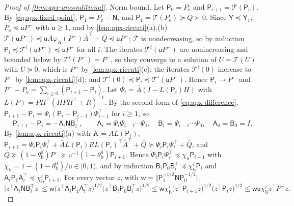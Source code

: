 \begin{proof}[Proof of \cref{thm:apx-unconditional}]
Norm bound. Let $\mathsf P_0=P_{\mathrm e}$ and $\mathsf P_{i+1}=\mathcal T(\mathsf P_i)$. By \cref{eq:apx-fixed-point}, $\mathsf P_1=P_{\mathrm e}-\mathsf N$, and $\mathsf P_1=\mathcal T(P_{\mathrm e})\succeq\bar Q\succ0$. Since $\mathsf Y\preceq\mathsf Y_1$, $P_{\mathrm e}\preceq\mathsf uP^-$ with $\mathsf u\ge1$, and by \cref{lem:apx-riccati}(a),(b) $\mathcal T(\mathsf uP^-)\preceq\mathsf u\bar A\varphi_R(P^-)\bar A^\top+\bar Q\preceq\mathsf uP^-$; $\mathcal T$ is nondecreasing, so by induction $\mathsf P_i\preceq\mathcal T^i(\mathsf uP^-)\preceq\mathsf uP^-$ for all $i$. The iterates $\mathcal T^i(\mathsf uP^-)$ are nonincreasing and bounded below by $\mathcal T^i(P^-)=P^-$, so they converge to a solution of $U=\mathcal T(U)$ with $U\succeq0$, which is $P^-$ by \cref{lem:apx-riccati}(c); the iterates $\mathcal T^i(0)$ increase to $P^-$ by \cref{lem:apx-riccati}(d); and $\mathcal T^i(0)\preceq\mathsf P_i\preceq\mathcal T^i(\mathsf uP^-)$. Hence $\mathsf P_i\to P^-$ and $P^--P_{\mathrm e}=\sum_{i\ge0}(\mathsf P_{i+1}-\mathsf P_i)$. Let $\Psi_i=\bar A(I-L(\mathsf P_i)H)$ with $L(P)=PH^\top(HPH^\top+R)^{-1}$. By the second form of \cref{eq:apx-difference}, $\mathsf P_{i+1}-\mathsf P_i=\Psi_i(\mathsf P_i-\mathsf P_{i-1})\Psi_{i-1}^\top$ for $i\ge1$, so
\begin{equation*}
\mathsf P_{i+1}-\mathsf P_i=-\mathsf A_i\mathsf N\mathsf B_i^\top,\qquad\mathsf A_i=\Psi_i\Psi_{i-1}\cdots\Psi_1,\quad\mathsf B_i=\Psi_{i-1}\cdots\Psi_0,\quad\mathsf A_0=\mathsf B_0=I .
\end{equation*}
By \cref{lem:apx-riccati}(a) with $K=\bar AL(\mathsf P_i)$, $\mathsf P_{i+1}=\Psi_i\mathsf P_i\Psi_i^\top+\bar AL(\mathsf P_i)RL(\mathsf P_i)^\top\bar A^\top+\bar Q\succeq\Psi_i\mathsf P_i\Psi_i^\top+\bar Q$, and $\bar Q\succeq(1-\theta^0_{\mathrm b})P^-\succeq\mathsf u^{-1}(1-\theta^0_{\mathrm b})\mathsf P_{i+1}$. Hence $\Psi_i\mathsf P_i\Psi_i^\top\preceq\chi_{\mathrm b}\mathsf P_{i+1}$ with $\chi_{\mathrm b}=1-(1-\theta^0_{\mathrm b})/\mathsf u\in[0,1)$, and by induction $\mathsf B_i\mathsf P_0\mathsf B_i^\top\preceq\chi_{\mathrm b}^i\mathsf P_i$ and $\mathsf A_i\mathsf P_1\mathsf A_i^\top\preceq\chi_{\mathrm b}^i\mathsf P_{i+1}$. For every vector $z$, with $\mathsf w=\Vert\mathsf P_1^{-1/2}\mathsf N\mathsf P_0^{-1/2}\Vert$,
\begin{equation*}
\bigl\lvert z^\top\mathsf A_i\mathsf N\mathsf B_i^\top z\bigr\rvert\le\mathsf w\bigl(z^\top\mathsf A_i\mathsf P_1\mathsf A_i^\top z\bigr)^{1/2}\bigl(z^\top\mathsf B_i\mathsf P_0\mathsf B_i^\top z\bigr)^{1/2}\le\mathsf w\chi_{\mathrm b}^i\bigl(z^\top\mathsf P_{i+1}z\bigr)^{1/2}\bigl(z^\top\mathsf P_iz\bigr)^{1/2}\le\mathsf w\mathsf u\chi_{\mathrm b}^iz^\top P^-z .

\end{equation*}
\end{proof}
